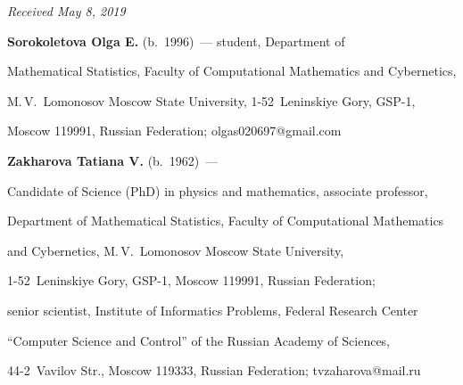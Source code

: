 \vspace*{-3pt}



\hfill{\small\textit{Received May 8, 2019}} 






\Contr



\noindent

\textbf{Sorokoletova Olga E.} (b.\ 1996)~--- student, Department of 

Mathematical Statistics, Faculty of Computational Mathematics and Cybernetics, 

M.\,V.~Lomonosov Moscow State University, 1-52~Leninskiye Gory, GSP-1, 

Moscow 119991, Russian Federation; \mbox{olgas020697@gmail.com}



\vspace*{3pt}



\noindent

\textbf{Zakharova Tatiana V.} (b.\ 1962)~--- 

Candidate of Science (PhD) in physics and mathematics, associate professor, 

Department of Mathematical Statistics, Faculty of Computational Mathematics 

and Cybernetics, M.\,V.~Lomonosov Moscow State University, 

1-52~Leninskiye Gory, GSP-1, Moscow 119991, Russian Federation; 

senior scientist, Institute of Informatics Problems, Federal Research Center 

``Computer Science and Control'' of the Russian Academy of Sciences, 

44-2~Vavilov Str., Moscow 119333, Russian Federation; \mbox{tvzaharova@mail.ru}

\label{end\stat}





\renewcommand{\bibname}{\protect\rm Литература}

